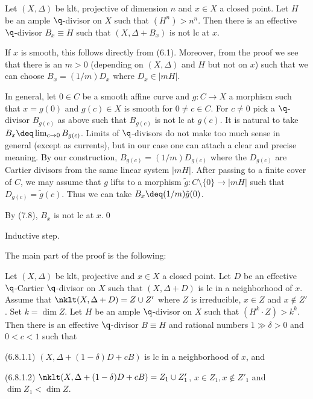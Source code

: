  Let  $(X,\Delta)$ be  klt,  projective of
dimension $n$ and 
$x\in X$ a closed point.  Let
$H$ be an ample
$\q$-divisor on
$X$ such that $(H^n)>n^n$. Then  there is an
effective
$\q$-divisor
$B_x\equiv H$  such that 
 $(X,\Delta+B_x)$ is not lc at  
 $x$.
\endproclaim

\demop If $x$ is smooth, this follows directly from (6.1).  Moreover, from the
proof we see that there is an $m>0$ 
(depending on $(X,\Delta)$ and $H$ but not on $x$)
such that we can choose
$B_x=(1/m)D_x$ where $D_x\in |mH|$. 

In general, let $0\in C$ be a smooth affine  curve and $g:C\to X$ a
morphism such that $x=g(0)$ and $g(c)\in X$ is smooth for  $0\neq c\in C$. For
 $c\neq 0$ pick a $\q$-divisor 
$B_{g(c)}$  as above such that $B_{g(c)}$ is not lc at $g(c)$.   It is natural
to take  
$B_x\deq \lim_{c\to 0} B_{g(c)}$. Limits of $\q$-divisors do not make too
much sense in general (except as currents), but in our case one can attach a
clear and precise meaning.  By our construction, $B_{g(c)}=(1/m)D_{g(c)}$
where the
$D_{g(c)}$ are Cartier divisors from the same linear system $|mH|$. After
 passing to a finite cover of $C$, we may assume that $g$ lifts to a morphism
$\tilde g:C\setminus\{0\}\to |mH|$ such that 
$D_{g(c)}=\tilde g(c)$. Thus we can take $B_x\deq (1/m)\tilde g(0)$.

By (7.8), $B_x$  is not lc  at $x$.\qed\enddemo
\enddemo







 Inductive step. 



The main part of the proof is the following:

 Let  $(X,\Delta)$ be  klt,  projective and 
$x\in X$ a closed point. Let
$D$ be an effective $\q$-Cartier $\q$-divisor on $X$ such that  $(X,\Delta+D)$
is lc in a neighborhood of $x$. Assume that 
$\nklt(X,\Delta+D)= Z\cup Z'$ where $Z$ is irreducible, $x\in Z$ and $x\not\in
Z'$. Set 
$k=\dim Z$.  Let
$H$ be an ample
$\q$-divisor on
$X$ such that $(H^k\cdot Z)>k^k$. Then  there is an
effective
$\q$-divisor
$B\equiv H$ and rational numbers $1\gg \delta>0$ and $0<c<1$ such that 

(6.8.1.1) $(X,\Delta+(1-\delta)D+ cB)$ is lc 
in a neighborhood of $x$, and

(6.8.1.2) 
$ \nklt(X,\Delta+(1-\delta)D+ cB)=Z_1\cup Z'_1$, $x\in Z_1, x\not\in Z'_1$ and 
$\dim Z_1<\dim Z$.
\endproclaim




